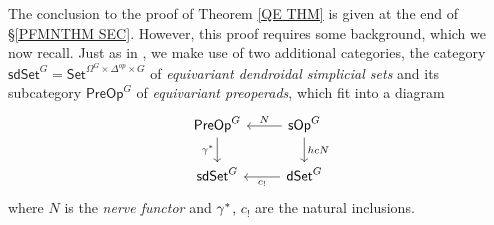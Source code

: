 \documentclass[a4paper,10pt]{article}%
\numberwithin{equation}{section}
\numberwithin{figure}{section}
\theoremstyle{definition} %
\newcommand{\1}{\ensuremath{\mathbbm 1}}%
\begin{document}
The conclusion to the proof of Theorem \ref{QE THM}
is given at the end of 
\S \ref{PFMNTHM SEC}.
However, this proof requires some background, which we now recall.
Just as in \cite{CM13b},
we make use of two additional categories,
the category 
$\mathsf{sdSet}^G
= \mathsf{Set}^{\Omega^G\times \Delta^{op} \times G}$
of \emph{equivariant dendroidal simplicial sets}
and its 
subcategory
$\mathsf{PreOp}^G$
of \emph{equivariant preoperads}, which fit into a diagram
\begin{equation}\label{ADJSQ EQ}
	\begin{tikzcd}
	\mathsf{PreOp}^G \ar{d}[swap]{\gamma^{\**}}&
	\mathsf{sOp}^G \ar{l}[swap]{N} \ar{d}{hcN}
\\
	\mathsf{sdSet}^G &
	\mathsf{dSet}^G \ar{l}{c_{!}}
	\end{tikzcd}
\end{equation}
where $N$ is the \emph{nerve functor}
and $\gamma^{\**}$, $c_!$ are the natural inclusions.
\end{document}
